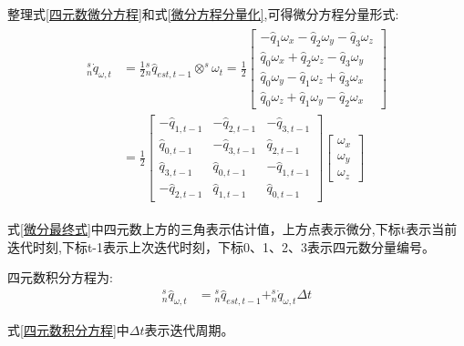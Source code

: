 \documentclass[12pt,a4paper]{article}
\begin{document}
整理式\ref{四元数微分方程}和式\ref{微分方程分量化},可得微分方程分量形式:
\begin{eqnarray}
    \begin{aligned}
    ^s_n\dot{q}_{\omega,t}&=\frac{1}{2}{^s_n\hat{q}_{est,t-1}}\otimes^s\omega_t
    =\frac{1}{2}
    \left[\begin{array}{c}
        - \hat{q}_1 \omega_x - \hat{q}_2 \omega_y - \hat{q}_3 \omega_z \\
          \hat{q}_0 \omega_x + \hat{q}_2 \omega_z - \hat{q}_3 \omega_y \\
          \hat{q}_0 \omega_y - \hat{q}_1 \omega_z + \hat{q}_3 \omega_x \\
          \hat{q}_0 \omega_z + \hat{q}_1 \omega_y - \hat{q}_2 \omega_x
    \end{array}\right] \\
    &=\frac{1}{2}
    \left[ \begin{array}{rrr}
            -\hat{q}_{1,t-1} & -\hat{q}_{2,t-1} & -\hat{q}_{3,t-1} \\
             \hat{q}_{0,t-1} & -\hat{q}_{3,t-1} &  \hat{q}_{2,t-1} \\
             \hat{q}_{3,t-1} &  \hat{q}_{0,t-1} & -\hat{q}_{1,t-1} \\
            -\hat{q}_{2,t-1} &  \hat{q}_{1,t-1} &  \hat{q}_{0,t-1}
    \end{array} \right]
    \left[\begin{array}{c}
            \omega_{x} \\
            \omega_{y} \\
            \omega_{z}
    \end{array}\right] \label{微分最终式}
    \end{aligned}
\end{eqnarray}

式\ref{微分最终式}中四元数上方的三角表示估计值，上方点表示微分,下标t表示当前迭代时刻,下标t-1表示上次迭代时刻，下标0、1、2、3表示四元数分量编号。

四元数积分方程为:
\begin{eqnarray}\label{四元数积分方程}
    ^s_n\hat{q}_{\omega,t}&={^s_n\hat{q}_{est,t-1}}+^s_n\dot{q}_{\omega,t}\Delta t
\end{eqnarray}

式\ref{四元数积分方程}中$\Delta t$表示迭代周期。
\end{document}
